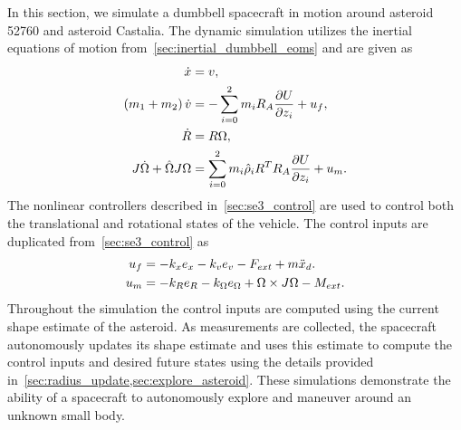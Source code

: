 In this section, we simulate a dumbbell spacecraft in motion around asteroid \num{52760} and asteroid Castalia.
The dynamic simulation utilizes the inertial equations of motion from~\cref{sec:inertial_dumbbell_eoms} and are given as
\begin{align*}
    \dot{x} &= v, \\
    \left( m_1 + m_2 \right) \dot{v} &= - \sum_{i=0}^2 m_i R_A \frac{\partial U}{\partial z_i} + u_f, \\
    \dot{R} &= R \Omega, \\
    J \dot{\Omega} + \hat{\Omega} J \Omega &= \sum_{i=0}^2 m_i \hat{\rho}_i R^T R_A \frac{\partial U}{\partial z_i} + u_m. 
\end{align*}
The nonlinear controllers described in~\cref{sec:se3_control} are used to control both the translational and rotational states of the vehicle.
The control inputs are duplicated from~\cref{sec:se3_control} as
\begin{align*}
    u_f &= -k_x e_x - k_v e_v - F_{ext} + m \ddot{x}_d . \\
    u_m &= -k_R e_R - k_\Omega e_\Omega + \Omega \times J \Omega - M_{ext}.
\end{align*}
Throughout the simulation the control inputs are computed using the current shape estimate of the asteroid. 
As measurements are collected, the spacecraft autonomously updates its shape estimate and uses this estimate to compute the control inputs and desired future states using the details provided in~\cref{sec:radius_update,sec:explore_asteroid}.
These simulations demonstrate the ability of a spacecraft to autonomously explore and maneuver around an unknown small body.

